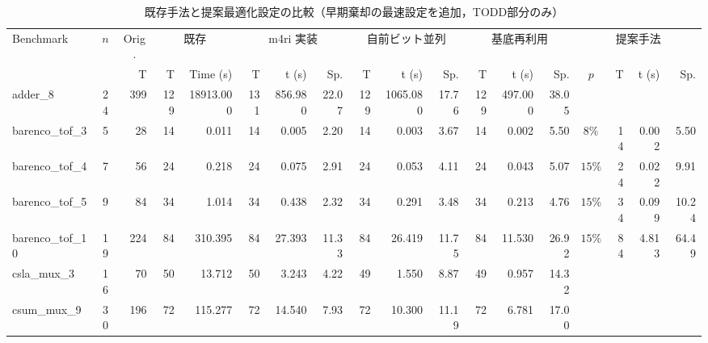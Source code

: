 \begin{table}[htbp]
\centering
\caption{既存手法と提案最適化設定の比較（早期棄却の最速設定を追加，TODD部分のみ）}
\label{tab:optimization_comparison_with_sketch}
\scriptsize
\setlength{\tabcolsep}{2.0pt}
\renewcommand{\arraystretch}{1.3}
\begin{tabular}{l c r | r r | r r r | r r r | r r r | c r r r}
\toprule
\multirow{2}{*}{Benchmark} & \multirow{2}{*}{$n$} & \multicolumn{1}{c|}{Orig.} & \multicolumn{2}{c|}{既存} & \multicolumn{3}{c|}{m4ri 実装} & \multicolumn{3}{c|}{自前ビット並列} & \multicolumn{3}{c|}{基底再利用} & \multicolumn{4}{c}{提案手法} \\
\cmidrule(lr){3-3} \cmidrule(lr){4-5} \cmidrule(lr){6-8} \cmidrule(lr){9-11} \cmidrule(lr){12-14} \cmidrule(lr){15-18}
 & & T & T & Time (s) & T & t (s) & Sp. & T & t (s) & Sp. & T & t (s) & Sp. & $p$ & T & t (s) & Sp. \\
\midrule
adder_8 & 24 & 399 & \cellcolor{bestT}129 & 18913.000 & 131 & 856.980 & 22.07 & \cellcolor{bestT}129 & 1065.080 & 17.76 & \cellcolor{bestT}129 & 497.000 & 38.05 &  &  &  &  \\
barenco_tof_3 & 5 & 28 & \cellcolor{bestT}14 & 0.011 & \cellcolor{bestT}14 & 0.005 & 2.20 & \cellcolor{bestT}14 & 0.003 & 3.67 & \cellcolor{bestT}14 & 0.002 & 5.50 & $8\%$ & \cellcolor{bestT}14 & 0.002 & 5.50 \\
barenco_tof_4 & 7 & 56 & \cellcolor{bestT}24 & 0.218 & \cellcolor{bestT}24 & 0.075 & 2.91 & \cellcolor{bestT}24 & 0.053 & 4.11 & \cellcolor{bestT}24 & 0.043 & 5.07 & $15\%$ & \cellcolor{bestT}24 & \cellcolor{bestTime}0.022 & 9.91 \\
barenco_tof_5 & 9 & 84 & \cellcolor{bestT}34 & 1.014 & \cellcolor{bestT}34 & 0.438 & 2.32 & \cellcolor{bestT}34 & 0.291 & 3.48 & \cellcolor{bestT}34 & 0.213 & 4.76 & $15\%$ & \cellcolor{bestT}34 & \cellcolor{bestTime}0.099 & 10.24 \\
barenco_tof_10 & 19 & 224 & \cellcolor{bestT}84 & 310.395 & \cellcolor{bestT}84 & 27.393 & 11.33 & \cellcolor{bestT}84 & 26.419 & 11.75 & \cellcolor{bestT}84 & 11.530 & 26.92 & $15\%$ & \cellcolor{bestT}84 & \cellcolor{bestTime}4.813 & 64.49 \\
csla_mux_3 & 16 & 70 & 50 & 13.712 & 50 & 3.243 & 4.22 & \cellcolor{bestT}49 & 1.550 & 8.87 & \cellcolor{bestT}49 & 0.957 & 14.32 &  &  &  &  \\
csum_mux_9 & 30 & 196 & \cellcolor{bestT}72 & 115.277 & \cellcolor{bestT}72 & 14.540 & 7.93 & \cellcolor{bestT}72 & 10.300 & 11.19 & \cellcolor{bestT}72 & 6.781 & 17.00 &  &  &  &  \\

\end{tabular}
\end{table}
